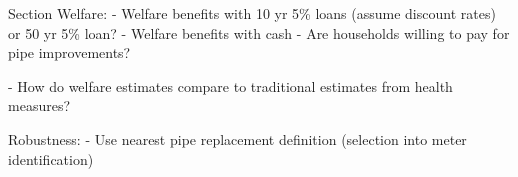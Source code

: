 \documentclass[12pt,table]{article}
\begin{document}
Section Welfare:
	- Welfare benefits with 10 yr 5\% loans (assume discount rates) or 50 yr 5\% loan?
	- Welfare benefits with cash
	- Are households willing to pay for pipe improvements?

	- How do welfare estimates compare to traditional estimates from health measures?

Robustness:
	- Use nearest pipe replacement definition (selection into meter identification)

















\end{document}
